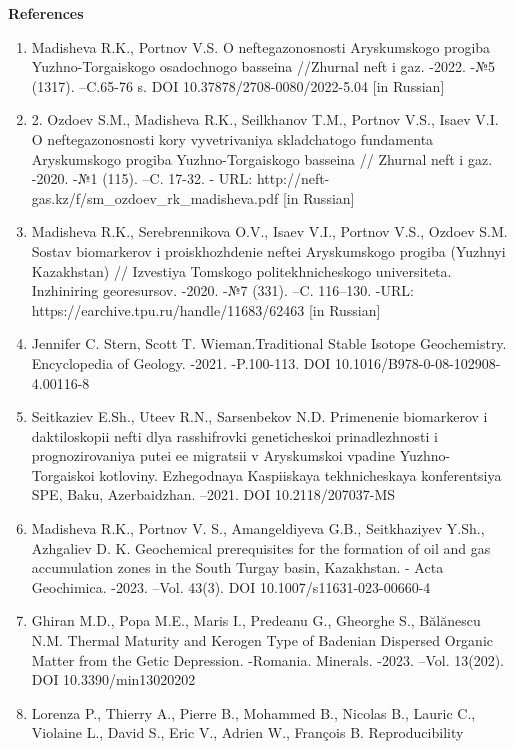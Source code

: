 {\bfseries References}

\begin{enumerate}
\def\labelenumi{\arabic{enumi}.}
\item
  Madisheva R.K., Portnov V.S. O neftegazonosnosti Aryskumskogo progiba
  Yuzhno-Torgaiskogo osadochnogo basseina //Zhurnal
  neft\textquotesingle{} i gaz. -2022. -№5 (1317). --C.65-76 s. DOI
  10.37878/2708-0080/2022-5.04 {[}in Russian{]}
\item
  2. Ozdoev S.M., Madisheva R.K., Seilkhanov T.M., Portnov V.S., Isaev
  V.I. O neftegazonosnosti kory vyvetrivaniya skladchatogo fundamenta
  Aryskumskogo progiba Yuzhno-Torgaiskogo basseina // Zhurnal
  neft\textquotesingle{} i gaz. -2020. -№1 (115). --C. 17-32. - URL:
  http://neft-gas.kz/f/sm\_ozdoev\_rk\_madisheva.pdf {[}in Russian{]}
\item
  Madisheva R.K., Serebrennikova O.V., Isaev V.I., Portnov V.S., Ozdoev
  S.M. Sostav biomarkerov i proiskhozhdenie neftei Aryskumskogo progiba
  (Yuzhnyi Kazakhstan) // Izvestiya Tomskogo politekhnicheskogo
  universiteta. Inzhiniring georesursov. -2020. -№7 (331). --C.
  116--130. -URL: https://earchive.tpu.ru/handle/11683/62463 {[}in
  Russian{]}
\item
  Jennifer C. Stern, Scott T. Wieman.Traditional Stable Isotope
  Geochemistry. Encyclopedia of Geology. -2021. -P.100-113. DOI
  10.1016/B978-0-08-102908-4.00116-8
\item
  Seitkaziev E.Sh., Uteev R.N., Sarsenbekov N.D. Primenenie biomarkerov
  i daktiloskopii nefti dlya rasshifrovki geneticheskoi prinadlezhnosti
  i prognozirovaniya putei ee migratsii v Aryskumskoi vpadine
  Yuzhno-Torgaiskoi kotloviny. Ezhegodnaya Kaspiiskaya tekhnicheskaya
  konferentsiya SPE, Baku, Azerbaidzhan. --2021. DOI 10.2118/207037-MS
\item
  Madisheva R.K., Portnov V. S., Amangeldiyeva G.B., Seitkhaziyev Y.Sh.,
  Azhgaliev D. K. Geochemical prerequisites for the formation of oil and
  gas accumulation zones in the South Turgay basin, Kazakhstan. - Acta
  Geochimica. -2023. --Vol. 43(3). DOI 10.1007/s11631-023-00660-4
\item
  Ghiran M.D., Popa M.E., Maris I., Predeanu G., Gheorghe S., Bălănescu
  N.M. Thermal Maturity and Kerogen Type of Badenian Dispersed Organic
  Matter from the Getic Depression. -Romania. Minerals. -2023. --Vol.
  13(202). DOI 10.3390/min13020202
\item
  Lorenza P., Thierry A., Pierre B., Mohammed B., Nicolas B., Lauric C.,
  Violaine L., David S., Eric V., Adrien W., François B. Reproducibility

\end{enumerate}
